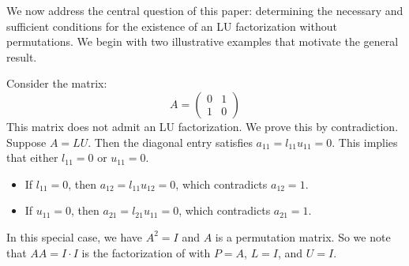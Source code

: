 \documentclass{article}
\begin{document}
We now address the central question of this paper: determining the necessary and sufficient conditions for the existence of an LU factorization without permutations. We begin with two illustrative examples that motivate the general result.

Consider the matrix:
\[
    A = \begin{pmatrix} 0 & 1 \\ 1 & 0 \end{pmatrix}
\]
This matrix does not admit an LU factorization. We prove this by contradiction. Suppose $A = LU$. Then the diagonal entry satisfies $a_{11} = l_{11} u_{11} = 0$. This implies that either $l_{11} = 0$ or $u_{11} = 0$.
\begin{itemize}
    \item If $l_{11} = 0$, then $a_{12} = l_{11} u_{12} = 0$, which contradicts $a_{12} = 1$.
    \item If $u_{11} = 0$, then $a_{21} = l_{21} u_{11} = 0$, which contradicts $a_{21} = 1$.
\end{itemize}

In this special case, we have $A^2 = I$ and $A$ is a permutation matrix. So we note that $A A = I \cdot I$ is the factorization of  with $P = A$, $L = I$, and $U = I$.
\end{document}
